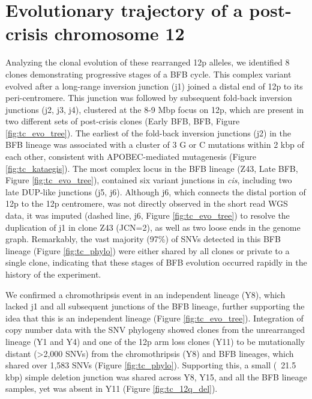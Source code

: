 \documentclass[phd,tocprelim]{cornell}
\begin{document}
\section{Evolutionary trajectory of a post-crisis chromosome 12}
Analyzing the clonal evolution of these rearranged 12p alleles, we identified 8 clones demonstrating progressive stages of a BFB cycle. This complex variant evolved after a long-range inversion junction (j1) joined a distal end of 12p to its peri-centromere. This junction was followed by subsequent fold-back inversion junctions (j2, j3, j4), clustered at the 8-9 Mbp focus on 12p, which are present in two different sets of post-crisis clones (Early BFB, BFB, Figure \ref{fig:tc_evo_tree}). The earliest of the fold-back inversion junctions (j2) in the BFB lineage was associated with a cluster of 3 G or C mutations within 2 kbp of each other, consistent with APOBEC-mediated mutagenesis \cite{Maciejowski2020-bw} (Figure \ref{fig:tc_kataegis}). The most complex locus in the BFB lineage (Z43, Late BFB, Figure \ref{fig:tc_evo_tree}), contained six variant junctions in \textit{cis}, including two late DUP-like junctions (j5, j6). Although j6, which connects the distal portion of 12p to the 12p centromere, was not directly observed in the short read WGS data, it was imputed (dashed line, j6, Figure \ref{fig:tc_evo_tree}) to resolve the duplication of j1 in clone Z43 (JCN=2), as well as two loose ends in the genome graph. Remarkably, the vast majority (97\%) of SNVs detected in this BFB lineage (Figure \ref{fig:tc_phylo}) were either shared by all clones or private to a single clone, indicating that these stages of BFB evolution occurred rapidly in the history of the experiment.

We confirmed a chromothripsis event in an independent lineage (Y8), which lacked j1 and all subsequent junctions of the BFB lineage, further supporting the idea that this is an independent lineage (Figure \ref{fig:tc_evo_tree}). Integration of copy number data with the SNV phylogeny showed clones from the unrearranged lineage (Y1 and Y4) and one of the 12p arm loss clones (Y11) to be mutationally distant (>2,000 SNVs) from the chromothripsis (Y8) and BFB lineages, which shared over 1,583 SNVs (Figure \ref{fig:tc_phylo}). Supporting this, a small (~21.5 kbp) simple deletion junction was shared across Y8, Y15, and all the BFB lineage samples, yet was absent in Y11 (Figure \ref{fig:tc_12q_del}).
\end{document}
